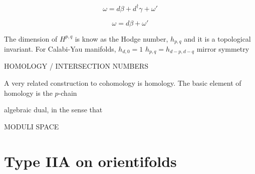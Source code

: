\begin{equation}
  \omega = d\beta + d^\dagger \gamma +\omega'
\end{equation}

\begin{equation}
  \omega = d\beta + \omega'
\end{equation}

The dimension of $H^{p,q}$ is know as the Hodge number, $h_{p,q}$ and it is a topological invariant.
For Calabi-Yau manifolds, $h_{d,0}=1$
$h_{p,q}=h_{d-p,d-q}$ mirror symmetry

HOMOLOGY / INTERSECTION NUMBERS

A very related construction to cohomology is homology.
The basic element of homology is the $p$-chain


algebraic dual, in the sense that

MODULI SPACE
%
%
%
%



\section{Type IIA on orientifolds}

